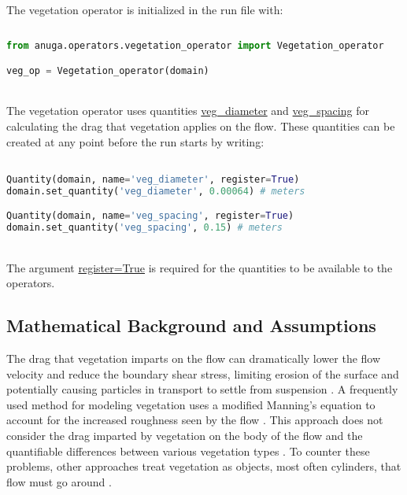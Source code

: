 \documentclass[10pt]{article}
\begin{document}
The vegetation operator is initialized in the run file with:

\begin{minipage}[c]{0.95\textwidth}
\begin{lstlisting}[language=Python, title=Initializing the vegetation operator]
 
from anuga.operators.vegetation_operator import Vegetation_operator

veg_op = Vegetation_operator(domain)

\end{lstlisting}
\end{minipage}
\ \\

The vegetation operator uses quantities \url{veg_diameter} and \url{veg_spacing} for calculating the drag that vegetation applies on the flow. These quantities can be created at any point before the run starts by writing:

\begin{minipage}[c]{0.95\textwidth}
\begin{lstlisting}[language=Python, title=Creating vegetation quantities]

Quantity(domain, name='veg_diameter', register=True)
domain.set_quantity('veg_diameter', 0.00064) # meters

Quantity(domain, name='veg_spacing', register=True)
domain.set_quantity('veg_spacing', 0.15) # meters

\end{lstlisting}
\end{minipage}
\ \\

The argument \url{register=True} is required for the quantities to be available to the operators.

\subsection{Mathematical Background and Assumptions}

The drag that vegetation imparts on the flow can dramatically lower the flow velocity and reduce the boundary shear stress, limiting erosion of the surface and potentially causing particles in transport to settle from suspension \citep{li1973effect,pasche1985overbank,lopez1998open,jordanova2003experimental}. A frequently used method for modeling vegetation uses a modified Manning's equation to account for the increased roughness seen by the flow \citep[e.g.,][]{guardo1995hydrodynamic}. This approach does not consider the drag imparted by vegetation on the body of the flow and the quantifiable differences between various vegetation types \citep[e.g.,][]{kadlec1990overland}. To counter these problems, other approaches treat vegetation as objects, most often cylinders, that flow must go around \citep[e.g.,][]{burke1982free,nepf1999drag}.
\end{document}
